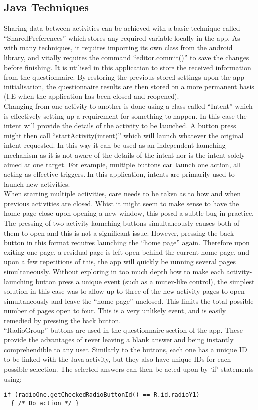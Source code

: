 \subsection{Java Techniques}
Sharing data between activities can be achieved with a basic technique called “SharedPreferences” which stores any required variable locally in the app. As with many techniques, it requires importing its own class from the android library, and vitally requires the command “editor.commit()” to save the changes before finishing. It is utilised in this application to store the received information from the questionnaire. By restoring the previous stored settings upon the app initialisation, the questionnaire results are then stored on a more permanent basis (I.E when the application has been closed and reopened).
\\ Changing from one activity to another is done using a class called “Intent” which is effectively setting up a requirement for something to happen. In this case the intent will provide the details of the activity to be launched. A button press might then call “startActivity(intent)” which will launch whatever the original intent requested. In this way it can be used as an independent launching mechanism as it is not aware of the details of the intent nor is the intent solely aimed at one target. For example, multiple buttons can launch one action, all acting as effective triggers. In this application, intents are primarily used to launch new activities.
\\ When starting multiple activities, care needs to be taken as to how and when previous activities are closed. Whist it might seem to make sense to have the home page close upon opening a new window, this posed a subtle bug in practice. The pressing of two activity-launching buttons simultaneously causes both of them to open and this is not a significant issue. However, pressing the back button in this format requires launching the “home page” again. Therefore upon exiting one page, a residual page is left open behind the current home page, and upon a few repetitions of this, the app will quickly be running several pages simultaneously. Without exploring in too much depth how to make each activity-launching button press a unique event (such as a mutex-like control), the simplest solution in this case was to allow up to three of the new activity pages to open simultaneously and leave the “home page” unclosed. This limits the total possible number of pages open to four. This is a very unlikely event, and is easily remedied by pressing the back button.
\\ “RadioGroup” buttons are used in the questionnaire section of the app. These provide the advantages of never leaving a blank answer and being instantly comprehendible to any user. Similarly to the buttons, each one has a unique ID to be linked with the Java activity, but they also have unique IDs for each possible selection. The selected answers can then be acted upon by ‘if’ statements using:
\begin{lstlisting}
if (radioOne.getCheckedRadioButtonId() == R.id.radioY1)
  { /* Do action */ } 
\end{lstlisting}
